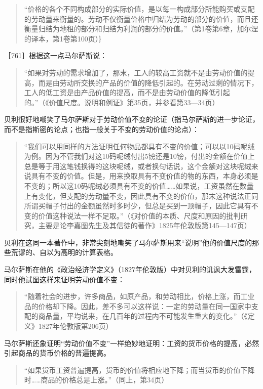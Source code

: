 \begin{quote}{“价格的各个不同构成部分的实际价值，是以每一构成部分所能购买或支配的劳动量来衡量的。劳动不仅衡量价格中归结为劳动的部分的价值，而且还衡量归结为地租的部分和归结为利润的部分的价值。”（第1卷第6章，加尔涅的译本，第1卷第100页）｝}\end{quote}

［761］根据这一点马尔萨斯说：

\begin{quote}{“如果对劳动的需求增加了，那末，工人的较高工资就不是由劳动价值的提高，而是由劳动所交换的产品的价值的降低引起的。在劳动过剩的情况下，工人的低工资是由产品价值的提高，而不是由劳动价值的降低引起的。”（《价值尺度。说明和例证》第35页，并参看第33—34页）}\end{quote}

贝利很好地嘲笑了马尔萨斯对于劳动价值不变的论证（指马尔萨斯的进一步论证，而不是指斯密的论点；也指一般关于不变的劳动价值的论点）：

\begin{quote}{“我们可以用同样的方法证明任何物品都具有不变的价值；可以以10码呢绒为例。因为不管我们对这10码呢绒付出5镑还是10镑，付出的金额在价值上总是等于用这笔钱换得的这块呢绒，或者换句话说，这个金额对这块呢绒来说具有不变的价值。但是，用来换取具有不变价值的物的东西，本身必须是不变的；所以这10码呢绒必须具有不变的价值……如果说，工资虽然在数量上有变化，但支配的劳动量不变，因此具有不变的价值，那末这种说法正同所谓买帽子付出的金额虽然时多时少，但总是买到一顶帽子，因此它具有不变的价值这种说法一样不足取。”（《对价值的本质、尺度和原因的批判研究，主要是论李嘉图先生及其信徒的著作》1825年伦敦版第145—147页）}\end{quote}

贝利在这同一本著作中，非常尖刻地嘲笑了马尔萨斯用来“说明”他的价值尺度的那些荒谬的、自以为高明的计算表格。

马尔萨斯在他的《政治经济学定义》（1827年伦敦版）中对贝利的讥讽大发雷霆，同时他试图这样来证明劳动价值不变：

\begin{quote}{“随着社会的进步，许多商品，如原产品，和劳动相比，价格上涨，而工业品的价格却下降。因此，差不多可以这样说：一定的劳动量在同一国家中支配的商品量，平均说来，在几百年的过程内不可能发生重大的变化。”（《定义》1827年伦敦版第206页）}\end{quote}

马尔萨斯还象证明“劳动价值不变”一样绝妙地证明：工资的货币价格的提高，必然引起商品的货币价格的普遍提高。

\begin{quote}{“如果货币工资普遍提高，货币的价值将相应地下降；而当货币的价值下降时……商品的价格总是上涨。”（同上，第34页）}\end{quote}

